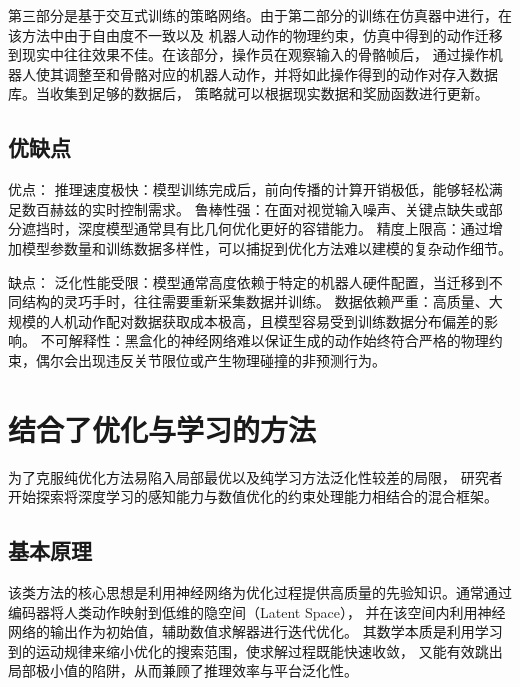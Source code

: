 第三部分是基于交互式训练的策略网络。由于第二部分的训练在仿真器中进行，在该方法中由于自由度不一致以及
机器人动作的物理约束，仿真中得到的动作迁移到现实中往往效果不佳。在该部分，操作员在观察输入的骨骼帧后，
通过操作机器人使其调整至和骨骼对应的机器人动作，并将如此操作得到的动作对存入数据库。当收集到足够的数据后，
策略就可以根据现实数据和奖励函数进行更新。

\subsection{优缺点}
优点：
推理速度极快：模型训练完成后，前向传播的计算开销极低，能够轻松满足数百赫兹的实时控制需求。
鲁棒性强：在面对视觉输入噪声、关键点缺失或部分遮挡时，深度模型通常具有比几何优化更好的容错能力。
精度上限高：通过增加模型参数量和训练数据多样性，可以捕捉到优化方法难以建模的复杂动作细节。

缺点：
泛化性能受限：模型通常高度依赖于特定的机器人硬件配置，当迁移到不同结构的灵巧手时，往往需要重新采集数据并训练。
数据依赖严重：高质量、大规模的人机动作配对数据获取成本极高，且模型容易受到训练数据分布偏差的影响。
不可解释性：黑盒化的神经网络难以保证生成的动作始终符合严格的物理约束，偶尔会出现违反关节限位或产生物理碰撞的非预测行为。

\section{结合了优化与学习的方法}
为了克服纯优化方法易陷入局部最优以及纯学习方法泛化性较差的局限，
研究者开始探索将深度学习的感知能力与数值优化的约束处理能力相结合的混合框架。
\subsection{基本原理}
该类方法的核心思想是利用神经网络为优化过程提供高质量的先验知识。通常通过编码器将人类动作映射到低维的隐空间（Latent Space），
并在该空间内利用神经网络的输出作为初始值，辅助数值求解器进行迭代优化。
其数学本质是利用学习到的运动规律来缩小优化的搜索范围，使求解过程既能快速收敛，
又能有效跳出局部极小值的陷阱，从而兼顾了推理效率与平台泛化性\cite{zhangHRGCN2D3DWholebody2025}\cite{dingBunnyvisionproRealtimeBimanual2025}。

